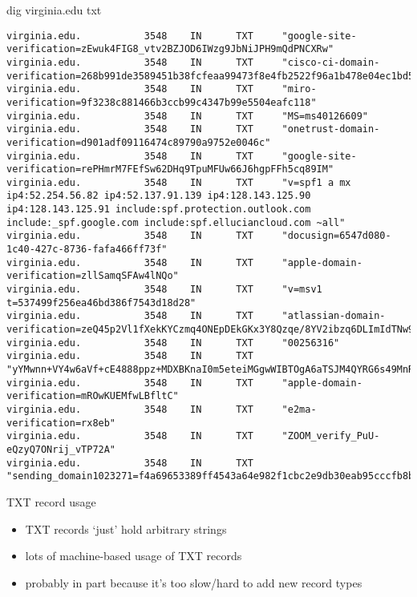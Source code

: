\begin{frame}[fragile]{dig virginia.edu txt}
\begin{Verbatim}[fontsize=\fontsize{8}{9}]
virginia.edu.           3548    IN      TXT     "google-site-verification=zEwuk4FIG8_vtv2BZJOD6IWzg9JbNiJPH9mQdPNCXRw"
virginia.edu.           3548    IN      TXT     "cisco-ci-domain-verification=268b991de3589451b38fcfeaa99473f8e4fb2522f96a1b478e04ec1bd5a25ff9"
virginia.edu.           3548    IN      TXT     "miro-verification=9f3238c881466b3ccb99c4347b99e5504eafc118"
virginia.edu.           3548    IN      TXT     "MS=ms40126609"
virginia.edu.           3548    IN      TXT     "onetrust-domain-verification=d901adf09116474c89790a9752e0046c"
virginia.edu.           3548    IN      TXT     "google-site-verification=rePHmrM7FEfSw62DHq9TpuMFUw66J6hgpFFh5cq89IM"
virginia.edu.           3548    IN      TXT     "v=spf1 a mx ip4:52.254.56.82 ip4:52.137.91.139 ip4:128.143.125.90 ip4:128.143.125.91 include:spf.protection.outlook.com include:_spf.google.com include:spf.elluciancloud.com ~all"
virginia.edu.           3548    IN      TXT     "docusign=6547d080-1c40-427c-8736-fafa466ff73f"
virginia.edu.           3548    IN      TXT     "apple-domain-verification=zllSamqSFAw4lNQo"
virginia.edu.           3548    IN      TXT     "v=msv1 t=537499f256ea46bd386f7543d18d28"
virginia.edu.           3548    IN      TXT     "atlassian-domain-verification=zeQ45p2Vl1fXekKYCzmq4ONEpDEkGKx3Y8Qzqe/8YV2ibzq6DLImIdTNw9Cv4lda"
virginia.edu.           3548    IN      TXT     "00256316"
virginia.edu.           3548    IN      TXT     "yYMwnn+VY4w6aVf+cE4888ppz+MDXBKnaI0m5eteiMGgwWIBTOgA6aTSJM4QYRG6s49MnR2Fj0grzaOKokmCow=="
virginia.edu.           3548    IN      TXT     "apple-domain-verification=mROwKUEMfwLBfltC"
virginia.edu.           3548    IN      TXT     "e2ma-verification=rx8eb"
virginia.edu.           3548    IN      TXT     "ZOOM_verify_PuU-eQzyQ7ONrij_vTP72A"
virginia.edu.           3548    IN      TXT     "sending_domain1023271=f4a69653389ff4543a64e982f1cbc2e9db30eab95cccfb8be58d883ce7849448"
\end{Verbatim}
\end{frame}

\begin{frame}{TXT record usage}
\begin{itemize}
\item TXT records `just' hold arbitrary strings
\item lots of machine-based usage of TXT records
\item probably in part because it's too slow/hard to add new record types
\end{itemize}
\end{frame}

